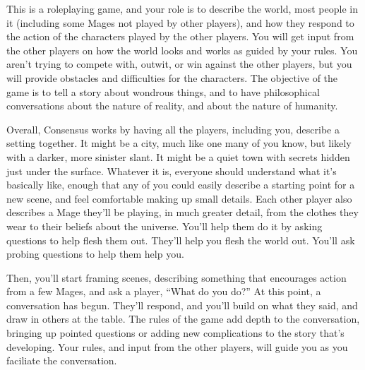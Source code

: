 \documentclass[
  oneside,
  statementpaper,
  9pt]{memoir}
\begin{document}
\begin{MC}

This is a roleplaying game, and your role is to describe the world, most people in it (including some Mages not played by other players), and how they respond to the action of the characters played by the other players. You will get input from the other players on how the world looks and works as guided by your rules. You aren't trying to compete with, outwit, or win against the other players, but you will provide obstacles and difficulties for the characters. The objective of the game is to tell a story about wondrous things, and to have philosophical conversations about the nature of reality, and about the nature of humanity.

Overall, Consensus works by having all the players, including you, describe a setting together. It might be a city, much like one many of you know, but likely with a darker, more sinister slant. It might be a quiet town with secrets hidden just under the surface. Whatever it is, everyone should understand what it’s basically like, enough that any of you could easily describe a starting point for a new scene, and feel comfortable making up small details. Each other player also describes a Mage they'll be playing, in much greater detail, from the clothes they wear to their beliefs about the universe. You'll help them do it by asking questions to help flesh them out. They'll help you flesh the world out. You'll ask probing questions to help them help you.

Then, you'll start framing scenes, describing something that encourages action from a few Mages, and ask a player, “What do you do?” At this point, a conversation has begun. They'll respond, and you'll build on what they said, and draw in others at the table. The rules of the game add depth to the conversation, bringing up pointed questions or adding new complications to the story that’s developing. Your rules, and input from the other players, will guide you as you faciliate the conversation.

\end{MC}
\end{document}
